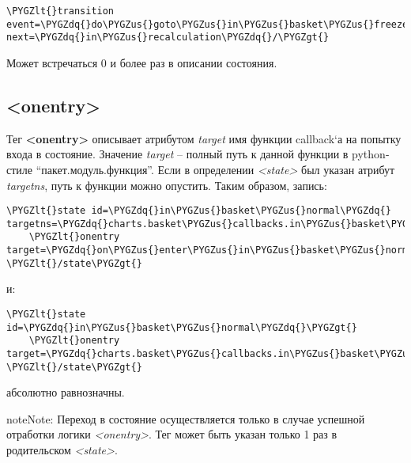 \documentclass[letterpaper,10pt,english]{sphinxmanual}
\def\PYGZus{\char`\_}
\def\PYGZlt{\char`\<}
\def\PYGZgt{\char`\>}
\def\PYGZdq{\char`\"}
\begin{document}
\begin{Verbatim}[commandchars=\\\{\}]
\PYGZlt{}transition event=\PYGZdq{}do\PYGZus{}goto\PYGZus{}in\PYGZus{}basket\PYGZus{}freeze\PYGZdq{} next=\PYGZdq{}in\PYGZus{}recalculation\PYGZdq{}/\PYGZgt{}
\end{Verbatim}

Может встречаться 0 и более раз в описании состояния.


\subsection{\textless{}onentry\textgreater{}}
\label{xml_format:onentry}
Тег \textbf{\textless{}onentry\textgreater{}} описывает атрибутом \emph{target} имя функции callback{}`а на попытку входа в состояние. Значение \emph{target} – полный путь к данной функции в python-стиле ``пакет.модуль.функция''. Если в определении \emph{\textless{}state\textgreater{}} был указан атрибут \emph{targetns}, путь к функции можно опустить. Таким образом, запись:

\begin{Verbatim}[commandchars=\\\{\}]
\PYGZlt{}state id=\PYGZdq{}in\PYGZus{}basket\PYGZus{}normal\PYGZdq{} targetns=\PYGZdq{}charts.basket\PYGZus{}callbacks.in\PYGZus{}basket\PYGZus{}normal\PYGZdq{}\PYGZgt{}
    \PYGZlt{}onentry target=\PYGZdq{}on\PYGZus{}enter\PYGZus{}in\PYGZus{}basket\PYGZus{}normal\PYGZdq{}/\PYGZgt{}
\PYGZlt{}/state\PYGZgt{}
\end{Verbatim}

и:

\begin{Verbatim}[commandchars=\\\{\}]
\PYGZlt{}state id=\PYGZdq{}in\PYGZus{}basket\PYGZus{}normal\PYGZdq{}\PYGZgt{}
    \PYGZlt{}onentry target=\PYGZdq{}charts.basket\PYGZus{}callbacks.in\PYGZus{}basket\PYGZus{}normal.on\PYGZus{}enter\PYGZus{}in\PYGZus{}basket\PYGZus{}normal\PYGZdq{}/\PYGZgt{}
\PYGZlt{}/state\PYGZgt{}
\end{Verbatim}

абсолютно равнозначны.

\begin{notice}{note}{Note:}
Переход в состояние осуществляется только в случае успешной отработки логики \emph{\textless{}onentry\textgreater{}}. Тег может быть указан только 1 раз в родительском \emph{\textless{}state\textgreater{}}.
\end{notice}
\end{document}
